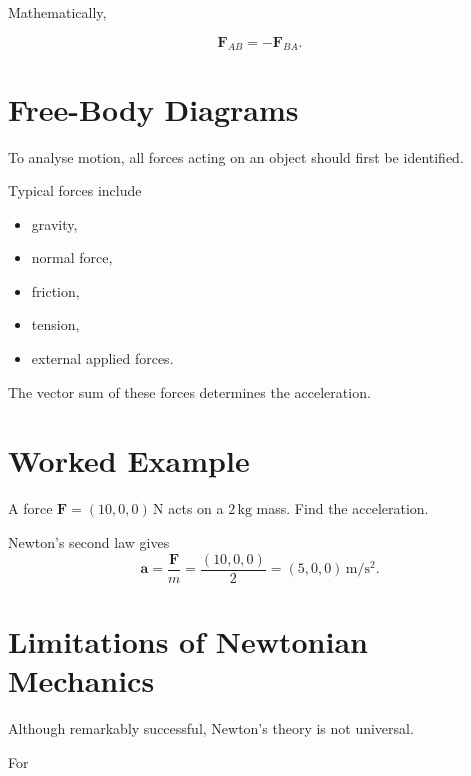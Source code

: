 \documentclass[11pt,a4paper,openany]{book}
\newcounter{example}[chapter]
\newcounter{remark}[chapter]
\begin{document}
Mathematically,

\[
\boxed{
	\mathbf F_{AB}
	=
	-
	\mathbf F_{BA}.
}
\]


\section{Free-Body Diagrams}

To analyse motion, all forces acting on an object should first be identified.

Typical forces include

\begin{itemize}
	\item gravity,
	\item normal force,
	\item friction,
	\item tension,
	\item external applied forces.
\end{itemize}

The vector sum of these forces determines the acceleration.


\section{Worked Example}

\begin{examplebox}
A force \(\mathbf F=(10,0,0)\,\mathrm N\) acts on a \(2\,\mathrm{kg}\) mass.
Find the acceleration.
\end{examplebox}

\begin{solutionbox}
Newton's second law gives
\[
\mathbf a=\frac{\mathbf F}{m}
=\frac{(10,0,0)}{2}
=(5,0,0)\,\mathrm{m/s^2}.
\]
\end{solutionbox}


\section{Limitations of Newtonian Mechanics}

Although remarkably successful, Newton's theory is not universal.

For
\end{document}
